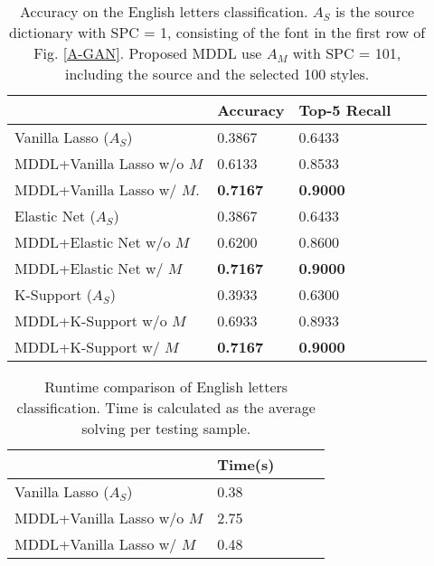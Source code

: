 \documentclass{article}
\begin{document}
\begin{table}[!tb]
\caption{Accuracy on the English letters classification. $A_S$ is the source dictionary with SPC = 1, consisting of the font in the first row of Fig. \ref{A-GAN}. Proposed MDDL use $A_M$ with SPC = 101, including the source and the selected 100 styles.}
\label{Table3}
\begin{center}
\begin{tabular}{|l|l|l|l|l|}
\hline
                              & Accuracy & Top-5 Recall        \\ \hline
Vanilla Lasso ($A_S$)         & 0.3867   & 0.6433              \\ \hline
MDDL+Vanilla Lasso w/o $M$    & 0.6133   & 0.8533              \\ \hline
MDDL+Vanilla Lasso w/ $M$.     & \bf{0.7167}   & \bf{0.9000}    \\ \hline
Elastic Net ($A_S$)           & 0.3867   & 0.6433              \\ \hline
MDDL+Elastic Net w/o $M$      & 0.6200   & 0.8600              \\ \hline
MDDL+Elastic Net w/ $M$        & \bf{0.7167}   & \bf{0.9000}    \\ \hline
K-Support ($A_S$)         & 0.3933   & 0.6300             \\ \hline
MDDL+K-Support w/o $M$        & 0.6933   & 0.8933             \\ \hline
MDDL+K-Support w/ $M$          & \bf{0.7167}   & \bf{0.9000}         \\ \hline 
\end{tabular}
\end{center}
\end{table}

\begin{table}[tb]
\caption{Runtime comparison of English letters classification. Time is calculated as the average solving per testing sample.}
\label{Table4}
\begin{center}
\begin{tabular}{|l|l|l|l|l|}
\hline
                            & Time(s) \\ \hline
Vanilla Lasso ($A_S$)       & 0.38     \\ \hline
MDDL+Vanilla Lasso w/o $M$  & 2.75    \\ \hline
MDDL+Vanilla Lasso w/ $M$   & 0.48            \\ \hline
\end{tabular}
\end{center}
\end{table}
\end{document}
